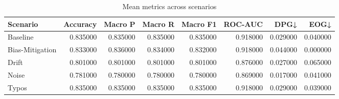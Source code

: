 \begin{table}
\caption{Mean metrics across scenarios}
\label{tab:metrics}
\begin{tabular}{lrrrrrrr}
\toprule
Scenario & Accuracy & Macro P & Macro R & Macro F1 & ROC-AUC & DPG↓ & EOG↓ \\
\midrule
Baseline & 0.835000 & 0.835000 & 0.835000 & 0.835000 & 0.918000 & 0.029000 & 0.040000 \\
Bias-Mitigation & 0.833000 & 0.836000 & 0.834000 & 0.832000 & 0.918000 & 0.044000 & 0.000000 \\
Drift & 0.801000 & 0.801000 & 0.801000 & 0.801000 & 0.876000 & 0.027000 & 0.065000 \\
Noise & 0.781000 & 0.780000 & 0.780000 & 0.780000 & 0.869000 & 0.017000 & 0.041000 \\
Typos & 0.835000 & 0.835000 & 0.835000 & 0.835000 & 0.918000 & 0.029000 & 0.039000 \\
\bottomrule
\end{tabular}
\end{table}

